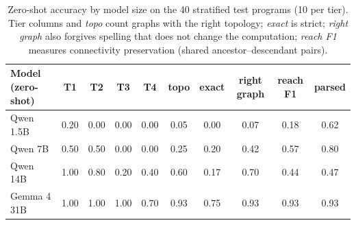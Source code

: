 \begin{table}[!h]
\centering
\small
\begin{tabular}{lccccccccc}
\hline
Model (zero-shot) & T1 & T2 & T3 & T4 & topo & exact & right graph & reach F1 & parsed \\
\hline
Qwen 1.5B & 0.20 & 0.00 & 0.00 & 0.00 & 0.05 & 0.00 & 0.07 & 0.18 & 0.62 \\
Qwen 7B & 0.50 & 0.50 & 0.00 & 0.00 & 0.25 & 0.20 & 0.42 & 0.57 & 0.80 \\
Qwen 14B & 1.00 & 0.80 & 0.20 & 0.40 & 0.60 & 0.17 & 0.70 & 0.44 & 0.47 \\
Gemma 4 31B & 1.00 & 1.00 & 1.00 & 0.70 & 0.93 & 0.75 & 0.93 & 0.93 & 0.93 \\
\hline
\end{tabular}
\caption{Zero-shot accuracy by model size on the 40 stratified test programs (10 per tier). Tier columns and \emph{topo} count graphs with the right topology; \emph{exact} is strict; \emph{right graph} also forgives spelling that does not change the computation; \emph{reach F1} measures connectivity preservation (shared ancestor--descendant pairs).}\label{tab:scale}
\end{table}
